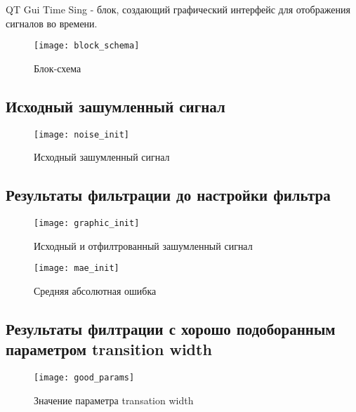 QT Gui Time Sing - блок, создающий графический интерфейс для отображения сигналов во времени.


\begin{figure}[H]
	\begin{center}
		\texttt{[image: block\_schema]}
		\caption{Блок-схема}
		\label{pic:block_schema} %
	\end{center}
\end{figure}

\subsection{Исходный зашумленный сигнал}
\begin{figure}[H]
	\begin{center}
		\texttt{[image: noise\_init]}
		\caption{Исходный зашумленный сигнал}
		\label{pic:noise_init} %
	\end{center}
\end{figure}
\newpage

\subsection{Результаты фильтрации до настройки фильтра}
\begin{figure}[H]
	\begin{center}
		\texttt{[image: graphic\_init]}
		\caption{Исходный и отфилтрованный зашумленный сигнал}
		\label{pic:graphic_init} %
	\end{center}
\end{figure}

\begin{figure}[H]
	\begin{center}
		\texttt{[image: mae\_init]}
		\caption{Средняя абсолютная ошибка}
		\label{pic:mae_init} %
	\end{center}
\end{figure}
\newpage
\subsection{Результаты филтрации с хорошо подоборанным параметром transition width}
\begin{figure}[H]
	\begin{center}
		\texttt{[image: good\_params]}
		\caption{Значение параметра transation width}
		\label{pic:good_params} %
	\end{center}
\end{figure}


